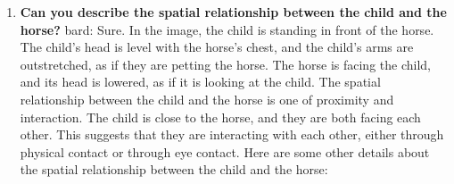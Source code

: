     \begin{enumerate}
        \item \textbf{Can you describe the spatial relationship between the child and the horse?}
        \subitem bard: 
        Sure. In the image, the child is standing in front of the horse. The child's head is level with the horse's chest, and the child's arms are outstretched, as if they are petting the horse. The horse is facing the child, and its head is lowered, as if it is looking at the child. The spatial relationship between the child and the horse is one of proximity and interaction. The child is close to the horse, and they are both facing each other. This suggests that they are interacting with each other, either through physical contact or through eye contact.
        Here are some other details about the spatial relationship between the child and the horse:


\end{enumerate}
